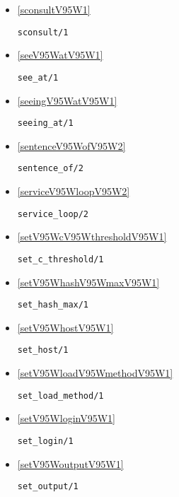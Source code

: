 \begin{itemize}
\item \ref{sconsultV95W1} 
\begin{verbatim}
sconsult/1
\end{verbatim}

\item \ref{seeV95WatV95W1} 
\begin{verbatim}
see_at/1
\end{verbatim}

\item \ref{seeingV95WatV95W1} 
\begin{verbatim}
seeing_at/1
\end{verbatim}

\item \ref{sentenceV95WofV95W2} 
\begin{verbatim}
sentence_of/2
\end{verbatim}

\item \ref{serviceV95WloopV95W2} 
\begin{verbatim}
service_loop/2
\end{verbatim}

\item \ref{setV95WcV95WthresholdV95W1} 
\begin{verbatim}
set_c_threshold/1
\end{verbatim}

\item \ref{setV95WhashV95WmaxV95W1} 
\begin{verbatim}
set_hash_max/1
\end{verbatim}

\item \ref{setV95WhostV95W1} 
\begin{verbatim}
set_host/1
\end{verbatim}

\item \ref{setV95WloadV95WmethodV95W1} 
\begin{verbatim}
set_load_method/1
\end{verbatim}

\item \ref{setV95WloginV95W1} 
\begin{verbatim}
set_login/1
\end{verbatim}

\item \ref{setV95WoutputV95W1} 
\begin{verbatim}
set_output/1
\end{verbatim}


\end{itemize}
